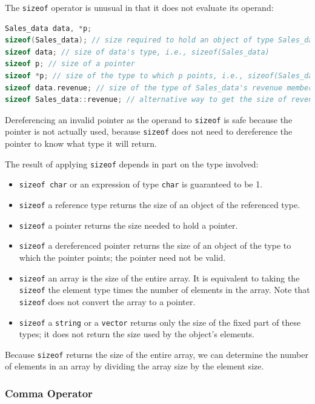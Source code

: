 The \texttt{sizeof} operator is unusual in that it does not evaluate its operand:
\begin{lstlisting}[language=C++]
Sales_data data, *p; 
sizeof(Sales_data); // size required to hold an object of type Sales_data 
sizeof data; // size of data's type, i.e., sizeof(Sales_data) 
sizeof p; // size of a pointer 
sizeof *p; // size of the type to which p points, i.e., sizeof(Sales_data) 
sizeof data.revenue; // size of the type of Sales_data's revenue member 
sizeof Sales_data::revenue; // alternative way to get the size of revenue
\end{lstlisting}
Dereferencing an invalid pointer as the operand to \texttt{sizeof} is safe because the pointer is not actually used, because \texttt{sizeof} does not need to dereference the pointer to know what type it will return.

The result of applying \texttt{sizeof} depends in part on the type involved:
\begin{itemize}
    \item \texttt{sizeof char} or an expression of type \texttt{char} is guaranteed to be 1.
    \item \texttt{sizeof} a reference type returns the size of an object of the referenced type.
    \item \texttt{sizeof} a pointer returns the size needed to hold a pointer.
    \item \texttt{sizeof} a dereferenced pointer returns the size of an object of the type to which the pointer points; the pointer need not be valid.
    \item \texttt{sizeof} an array is the size of the entire array. It is equivalent to taking the \texttt{sizeof} the element type times the number of elements in the array. Note that \texttt{sizeof} does not convert the array to a pointer.
    \item \texttt{sizeof} a \texttt{string} or a \texttt{vector} returns only the size of the fixed part of these types; it does not return the size used by the object's elements.
\end{itemize}
Because \texttt{sizeof} returns the size of the entire array, we can determine the number of elements in an array by dividing the array size by the element size.

\subsubsection{Comma Operator}

